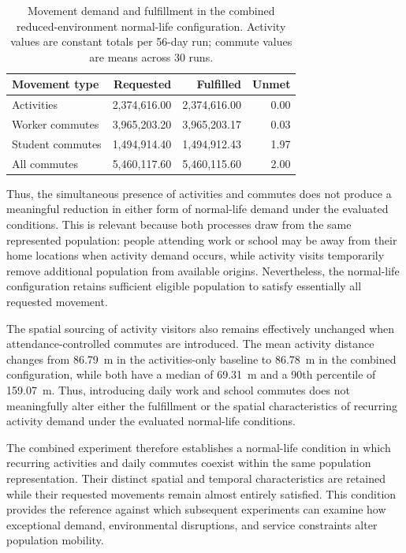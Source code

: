 \begin{table}[ht] 
    \centering 
    \caption{Movement demand and fulfillment in the combined reduced-environment normal-life configuration. Activity values are constant totals per 56-day run; commute values are means across 30 runs.} 
    \label{tbl:routine_mobility_fulfillment_summary} 
    \begin{tabular}{@{}lrrr@{}} 
    \toprule 
    \textbf{Movement type} & \textbf{Requested} & \textbf{Fulfilled} & \textbf{Unmet} \\ \midrule 
    Activities & 2,374,616.00 & 2,374,616.00 & 0.00 \\ 
    Worker commutes & 3,965,203.20 & 3,965,203.17 & 0.03 \\ 
    Student commutes & 1,494,914.40 & 1,494,912.43 & 1.97 \\ 
    All commutes & 5,460,117.60 & 5,460,115.60 & 2.00 \\ \bottomrule 
    \end{tabular}
\end{table}

Thus, the simultaneous presence of activities and commutes does not produce a meaningful reduction in either form of normal-life demand under the evaluated conditions. This is relevant because both processes draw from the same represented population: people attending work or school may be away from their home locations when activity demand occurs, while activity visits temporarily remove additional population from available origins. Nevertheless, the normal-life configuration retains sufficient eligible population to satisfy essentially all requested movement.

The spatial sourcing of activity visitors also remains effectively unchanged when attendance-controlled commutes are introduced. The mean activity distance changes from 86.79~m in the activities-only baseline to 86.78~m in the combined configuration, while both have a median of 69.31~m and a 90th percentile of 159.07~m. Thus, introducing daily work and school commutes does not meaningfully alter either the fulfillment or the spatial characteristics of recurring activity demand under the evaluated normal-life conditions.

The combined experiment therefore establishes a normal-life condition in which recurring activities and daily commutes coexist within the same population representation. Their distinct spatial and temporal characteristics are retained while their requested movements remain almost entirely satisfied. This condition provides the reference against which subsequent experiments can examine how exceptional demand, environmental disruptions, and service constraints alter population mobility.

